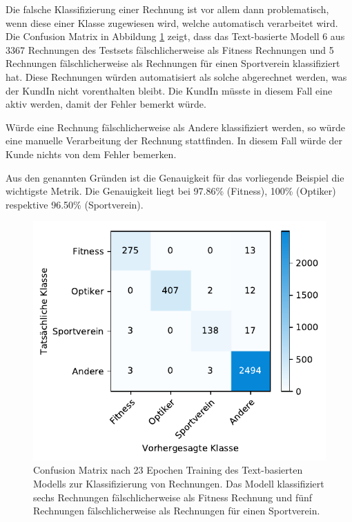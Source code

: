 Die falsche Klassifizierung einer Rechnung ist vor allem dann problematisch, wenn diese einer Klasse zugewiesen wird, welche automatisch verarbeitet wird. Die Confusion Matrix in Abbildung \ref{text-classification-cm} zeigt, dass das Text-basierte Modell 6 aus 3367 Rechnungen des Testsets fälschlicherweise als Fitness Rechnungen und 5 Rechnungen fälschlicherweise als Rechnungen für einen Sportverein klassifiziert hat. Diese Rechnungen würden automatisiert als solche abgerechnet werden, was der KundIn nicht vorenthalten bleibt. Die KundIn müsste in diesem Fall eine aktiv werden, damit der Fehler bemerkt würde.

Würde eine Rechnung fälschlicherweise als Andere klassifiziert werden, so würde eine manuelle Verarbeitung der Rechnung stattfinden. In diesem Fall würde der Kunde nichts von dem Fehler bemerken. 

Aus den genannten Gründen ist die Genauigkeit für das vorliegende Beispiel die wichtigste Metrik. Die Genauigkeit liegt bei 97.86\% (Fitness), 100\% (Optiker) respektive 96.50\% (Sportverein).

\begin{figure}[h!] 
    \captionsetup{width=.9\linewidth}
    \caption[Confusion Matrix des Text-basierten Modells zur Klassifizierung von Rechnungen]{Confusion Matrix nach 23 Epochen Training des Text-basierten Modells zur Klassifizierung von Rechnungen. Das Modell klassifiziert sechs Rechnungen fälschlicherweise als Fitness Rechnung und fünf Rechnungen fälschlicherweise als Rechnungen für einen Sportverein.}
    \label{text-classification-cm}
    \centering
    \includegraphics[scale=1]{graphics/matplot/textual-class__cm_22.pdf}
\end{figure}

